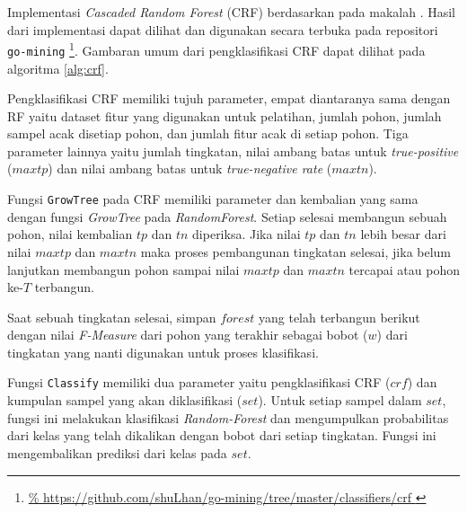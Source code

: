 Implementasi \textit{Cascaded Random Forest} (CRF) berdasarkan pada makalah
\textcite{baumann2013cascaded}.
Hasil dari implementasi dapat dilihat dan digunakan secara terbuka pada
repositori \texttt{go-mining}
\footnote{
\url{%
https://github.com/shuLhan/go-mining/tree/master/classifiers/crf
}}.
Gambaran umum dari pengklasifikasi CRF dapat dilihat pada algoritma
\ref{alg:crf}.

Pengklasifikasi CRF memiliki tujuh parameter, empat diantaranya sama dengan RF
yaitu dataset fitur yang digunakan untuk pelatihan, jumlah pohon, jumlah sampel
acak disetiap pohon, dan jumlah fitur acak di setiap pohon.
Tiga parameter lainnya yaitu jumlah tingkatan, nilai ambang batas untuk
\textit{true-positive} ($maxtp$) dan nilai ambang batas untuk
\textit{true-negative rate} ($maxtn$).

	

Fungsi \texttt{GrowTree} pada CRF memiliki parameter dan kembalian yang sama
dengan fungsi \textit{GrowTree} pada \textit{RandomForest}.
Setiap selesai membangun sebuah pohon, nilai kembalian $tp$ dan $tn$ diperiksa.
Jika nilai $tp$ dan $tn$ lebih besar dari nilai $maxtp$ dan $maxtn$ maka proses
pembangunan tingkatan selesai, jika belum lanjutkan membangun pohon sampai
nilai $maxtp$ dan $maxtn$ tercapai atau pohon ke-$T$ terbangun.

Saat sebuah tingkatan selesai, simpan $forest$ yang telah terbangun berikut
dengan nilai \textit{F-Measure} dari pohon yang terakhir sebagai bobot ($w$)
dari tingkatan yang nanti digunakan untuk proses klasifikasi.

Fungsi \texttt{Classify} memiliki dua parameter yaitu pengklasifikasi CRF
($crf$) dan kumpulan sampel yang akan diklasifikasi ($set$).
Untuk setiap sampel dalam $set$, fungsi ini melakukan klasifikasi
\textit{Random-Forest} dan mengumpulkan probabilitas dari kelas yang telah
dikalikan dengan bobot dari setiap tingkatan.
Fungsi ini mengembalikan prediksi dari kelas pada $set$.
